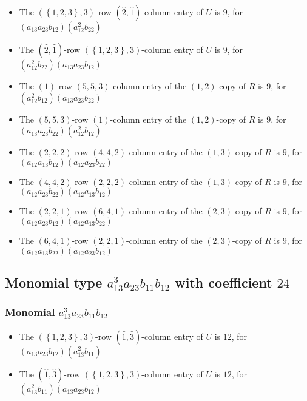 \documentclass{article}
\begin{document}
\begin{itemize}
\item The $ \left(\left\{1, 2, 3\right\}, 3\right) $-row $ (\hat{2}, \hat{1}) $-column entry of $U$ is $ 9 $, for $( a_{13} a_{23} b_{12} )( a_{12}^{2} b_{22} )$ 
\item The $(\hat{2}, \hat{1})$-row $ \left(\left\{1, 2, 3\right\}, 3\right) $-column entry of $U$ is $ 9 $, for $( a_{12}^{2} b_{22} )( a_{13} a_{23} b_{12} )$ 
\item The $(1)$-row $(5, 5, 3)$-column entry of the $ \left(1, 2\right) $-copy of $R$ is $ 9 $, for $( a_{12}^{2} b_{12} )( a_{13} a_{23} b_{22} )$ 
\item The $(5, 5, 3)$-row $(1)$-column entry of the $ \left(1, 2\right) $-copy of $R$ is $ 9 $, for $( a_{13} a_{23} b_{22} )( a_{12}^{2} b_{12} )$ 
\item The $(2, 2, 2)$-row $(4, 4, 2)$-column entry of the $ \left(1, 3\right) $-copy of $R$ is $ 9 $, for $( a_{12} a_{13} b_{12} )( a_{12} a_{23} b_{22} )$ 
\item The $(4, 4, 2)$-row $(2, 2, 2)$-column entry of the $ \left(1, 3\right) $-copy of $R$ is $ 9 $, for $( a_{12} a_{23} b_{22} )( a_{12} a_{13} b_{12} )$ 
\item The $(2, 2, 1)$-row $(6, 4, 1)$-column entry of the $ \left(2, 3\right) $-copy of $R$ is $ 9 $, for $( a_{12} a_{23} b_{12} )( a_{12} a_{13} b_{22} )$ 
\item The $(6, 4, 1)$-row $(2, 2, 1)$-column entry of the $ \left(2, 3\right) $-copy of $R$ is $ 9 $, for $( a_{12} a_{13} b_{22} )( a_{12} a_{23} b_{12} )$ 
\end{itemize}
\subsection{Monomial type $ a_{13}^{3} a_{23} b_{11} b_{12} $ with coefficient $ 24 $}

\subsubsection{Monomial $ a_{13}^{3} a_{23} b_{11} b_{12} $}

\begin{itemize}
\item The $ \left(\left\{1, 2, 3\right\}, 3\right) $-row $ (\hat{1}, \hat{3}) $-column entry of $U$ is $ 12 $, for $( a_{13} a_{23} b_{12} )( a_{13}^{2} b_{11} )$ 
\item The $(\hat{1}, \hat{3})$-row $ \left(\left\{1, 2, 3\right\}, 3\right) $-column entry of $U$ is $ 12 $, for $( a_{13}^{2} b_{11} )( a_{13} a_{23} b_{12} )$ 
\end{itemize}
\end{document}
